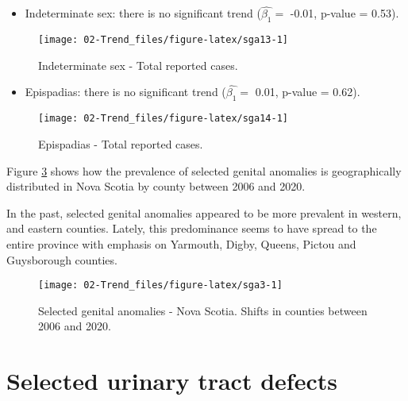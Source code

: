 \documentclass[
]{krantz}
\providecommand{\tightlist}{%
  \setlength{\itemsep}{0pt}\setlength{\parskip}{0pt}}
\begin{document}
\begin{itemize}
\tightlist
\item
  Indeterminate sex: there is no significant trend (\(\hat{\beta_{1}} =\) -0.01, p-value = 0.53).
\end{itemize}

\begin{figure}[h]

{\centering \texttt{[image: 02-Trend\_files/figure-latex/sga13-1]} 

}

\caption{Indeterminate sex - Total reported cases.}\label{fig:sga13}
\end{figure}

\begin{itemize}
\tightlist
\item
  Epispadias: there is no significant trend (\(\hat{\beta_{1}} =\) 0.01, p-value = 0.62).
\end{itemize}

\begin{figure}[h]

{\centering \texttt{[image: 02-Trend\_files/figure-latex/sga14-1]} 

}

\caption{Epispadias - Total reported cases.}\label{fig:sga14}
\end{figure}

Figure \ref{fig:sga3} shows how the prevalence of selected genital anomalies is geographically distributed in Nova Scotia by county between 2006 and 2020.

In the past, selected genital anomalies appeared to be more prevalent in western, and eastern counties. Lately, this predominance seems to have spread to the entire province with emphasis on Yarmouth, Digby, Queens, Pictou and Guysborough counties.

\begin{figure}[h]

{\centering \texttt{[image: 02-Trend\_files/figure-latex/sga3-1]} 

}

\caption{Selected genital anomalies - Nova Scotia. Shifts in counties between 2006 and 2020.}\label{fig:sga3}
\end{figure}

\clearpage

\hypertarget{section39}{%
\section{Selected urinary tract defects}\label{section39}}
\end{document}
